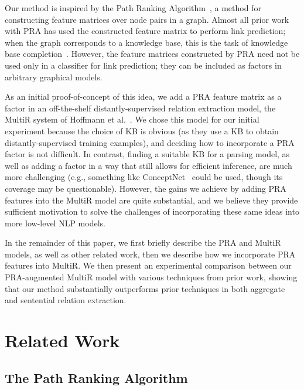 \documentclass[11pt,a4paper]{article}
\begin{document}
Our method is inspired by the Path Ranking Algorithm~\cite[PRA]{lao-2010-pra},
a method for constructing feature matrices over node pairs in a graph.  Almost
all prior work with PRA has used the constructed feature matrix to perform link
prediction; when the graph corresponds to a knowledge base, this is the task of
knowledge base completion~\cite{lao-2011-pra2,lao-2012-syntactic-pra,%
dong-2014-knowledge-vault,gardner-2013-latent-pra,gardner-2014-vector-space-pra}.
However, the feature matrices constructed by PRA need not be used only in a
classifier for link prediction; they can be included as factors in arbitrary
graphical models.

As an initial proof-of-concept of this idea, we add a PRA feature matrix as a
factor in an off-the-shelf distantly-supervised relation extraction model, the
MultiR system of Hoffmann et al.~.
We chose this model for our initial experiment because the choice of KB is
obvious (as they use a KB to obtain distantly-supervised training examples),
and deciding how to incorporate a PRA factor is not difficult.  In contrast,
finding a suitable KB for a parsing model, as well as adding a factor in a way
that still allows for efficient inference, are much more challenging (e.g.,
something like ConceptNet~\cite{conceptnet-2004} could be used, though its
coverage may be questionable).  However, the gains we achieve by adding PRA
features into the MultiR model are quite substantial, and we believe they
provide sufficient motivation to solve the challenges of incorporating these
same ideas into more low-level NLP models.

In the remainder of this paper, we first briefly describe the PRA and MultiR
models, as well as other related work, then we describe how we incorporate PRA
features into MultiR.  We then present an experimental comparison between our
PRA-augmented MultiR model with various techniques from prior work, showing
that our method substantially outperforms prior techniques in both aggregate
and sentential relation extraction.

\section{Related Work}

\subsection{The Path Ranking Algorithm}
\end{document}
